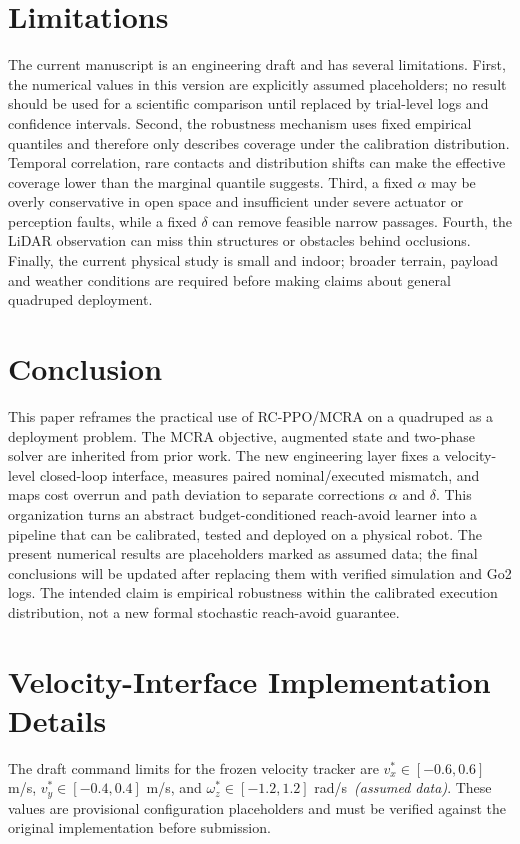 \documentclass{article}
\begin{document}
\section{Limitations}
The current manuscript is an engineering draft and has several limitations. First,
the numerical values in this version are explicitly assumed placeholders; no result
should be used for a scientific comparison until replaced by trial-level logs and
confidence intervals. Second, the robustness mechanism uses fixed empirical
quantiles and therefore only describes coverage under the calibration distribution.
Temporal correlation, rare contacts and distribution shifts can make the effective
coverage lower than the marginal quantile suggests. Third, a fixed $\alpha$ may be
overly conservative in open space and insufficient under severe actuator or
perception faults, while a fixed $\delta$ can remove feasible narrow passages.
Fourth, the LiDAR observation can miss thin structures or obstacles behind
occlusions. Finally, the current physical study is small and indoor; broader
terrain, payload and weather conditions are required before making claims about
general quadruped deployment.

\section{Conclusion}
This paper reframes the practical use of RC-PPO/MCRA on a quadruped as a deployment
problem. The MCRA objective, augmented state and two-phase solver are inherited
from prior work. The new engineering layer fixes a velocity-level closed-loop
interface, measures paired nominal/executed mismatch, and maps cost overrun and
path deviation to separate corrections $\alpha$ and $\delta$. This organization
turns an abstract budget-conditioned reach-avoid learner into a pipeline that can
be calibrated, tested and deployed on a physical robot. The present numerical
results are placeholders marked as assumed data; the final conclusions will be
updated after replacing them with verified simulation and Go2 logs. The intended
claim is empirical robustness within the calibrated execution distribution, not a
new formal stochastic reach-avoid guarantee.

\clearpage
\appendix
\section{Velocity-Interface Implementation Details}
\label{app:velocity_interface}
The draft command limits for the frozen velocity tracker are
$v_x^*\in[-0.6,0.6]$ m/s, $v_y^*\in[-0.4,0.4]$ m/s, and
$\omega_z^*\in[-1.2,1.2]$ rad/s~\textit{(assumed data)}. These values are
provisional configuration placeholders and must be verified against the original
implementation before submission.
\end{document}
